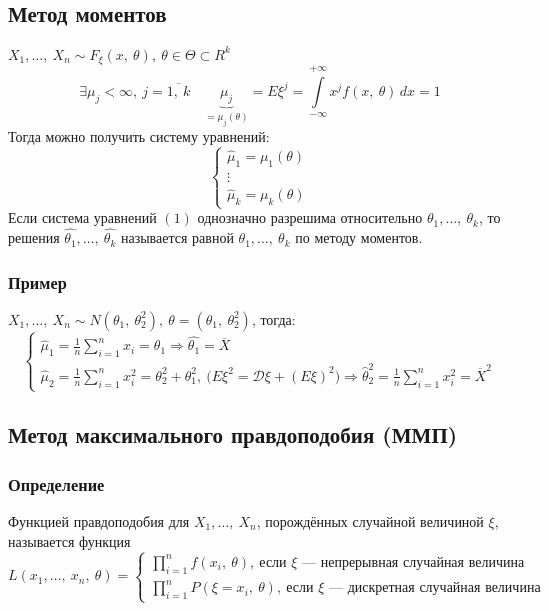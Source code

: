 \documentclass[12pt, a4paper]{article}
\newcommand{\sion}{\sum\limits_{i = 1}^{n}}
\newcommand{\dev}{\mathcal{D}}
\begin{document}
\subsection*{Метод моментов}
$X_1,\dots,\ X_n\sim F_{\xi}(x,\ \theta),\ \theta \in \Theta\subset R^k$
\[\exists \mu_j < \infty,\ j = \overline{1,\ k}\quad \underset{=\mu_j(\theta)}{\underbrace{\mu_j}} = E\xi^j = \int\limits_{-\infty}^{+\infty} x^j f(x,\ \theta)\, dx = 1\]
Тогда можно получить систему уравнений:
\begin{equation}
    \begin{cases}
        \hat{\mu}_1 = \mu_1(\theta)\\
        \vdots\\
        \hat{\mu}_k = \mu_k(\theta)
    \end{cases}
\end{equation}
Если система уравнений $(1)$ однозначно разрешима относительно $\theta_1,\dots,\ \theta_k$, то решения $\hat{\theta_1},\dots,\ \hat{\theta_k}$ называется равной $\theta_1,\dots,\ \theta_k$ по методу моментов.
\subsubsection*{Пример}
$X_1,\dots,\ X_n \sim N(\theta_1,\ \theta_2^2),\ \theta = (\theta_1,\ \theta_2^2)$, тогда:
\[\begin{cases}
    \hat{\mu}_1 = \frac{1}{n} \sion x_i = \theta_1\Rightarrow \hat{\theta_1} = \overline{X}\\
    \hat{\mu}_2 = \frac{1}{n} \sion x_i^2 = \theta_2^2 + \theta_1^2,\ \big(E\xi^2 = \dev \xi + (E\xi)^2\big)\Rightarrow \hat{\theta}_2^2 = \frac{1}{n}\sion  x_i^2 = \overline{X}^2
\end{cases}\]
\subsection*{Метод максимального правдоподобия (ММП)}
\subsubsection*{Определение}
Функцией правдоподобия для $X_1,\dots,\ X_n$, порождённых случайной величиной $\xi$, называется функция 
\[L(x_1,\dots,\ x_n,\ \theta) = \begin{cases}
    \prod\limits_{i = 1}^{n} f(x_i,\ \theta),\ \text{если $\xi$ --- непрерывная случайная величина}\\
    \prod\limits_{i = 1}^{n} P(\xi = x_i,\ \theta),\ \text{если $\xi$ --- дискретная случайная величина}
\end{cases}\]
\end{document}
